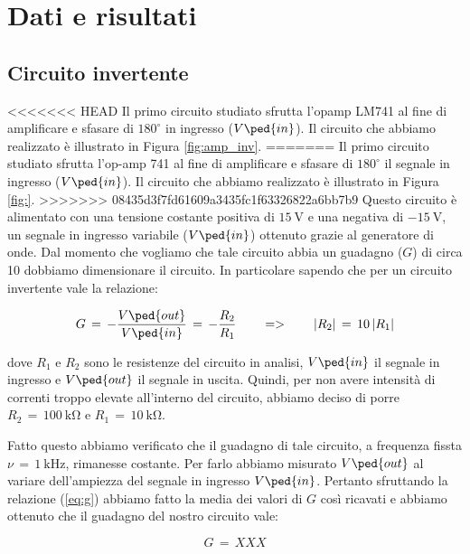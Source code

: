 \section*{Dati e risultati}

\subsection*{Circuito invertente}

<<<<<<< HEAD
Il primo circuito studiato sfrutta l'opamp LM741 al fine di amplificare e sfasare di $180^\circ$ in ingresso ($V\ped{in}$). Il circuito che abbiamo realizzato è illustrato in Figura \ref{fig:amp_inv}.
=======
Il primo circuito studiato sfrutta l'op-amp 741 al fine di amplificare e sfasare di $180^\circ$ il segnale in ingresso ($V\ped{in}$). Il circuito che abbiamo realizzato è illustrato in Figura \ref{fig:}.
>>>>>>> 08435d3f7fd61609a3435fc1f63326822a6bb7b9
Questo circuito è alimentato con una tensione costante positiva di $\SI{+15}{\volt}$ e una negativa di $\SI{-15}{\volt}$, un segnale in ingresso variabile ($V\ped{in}$) ottenuto grazie al generatore di onde.
Dal momento che vogliamo che tale circuito abbia un guadagno ($G$) di circa 10 dobbiamo dimensionare il circuito. In particolare sapendo che per un circuito invertente vale la relazione:

\begin{equation}
        G\,=\,-\frac{V\ped{out}}{V\ped{in}}\,=\,-\frac{R_2}{R_1} \qquad => \qquad |R_2|\,=\,10\,|R_1|
        \label{eq:g}
\end{equation}

dove $R_1$ e $R_2$ sono le resistenze del circuito in analisi, $V\ped{in}$ il segnale in ingresso e $V\ped{out}$ il segnale in uscita. Quindi, per non avere intensità di correnti troppo elevate all'interno del circuito, abbiamo deciso di porre $R_2\,=\,\SI{100}{\kilo\ohm}$ e $R_1\,=\,\SI{10}{\kilo\ohm}$.

Fatto questo abbiamo verificato che il guadagno di tale circuito, a frequenza fissta $\nu\,=\,\SI{1}{\kilo\hertz}$, rimanesse costante. Per farlo abbiamo misurato $V\ped{out}$ al variare dell'ampiezza del segnale in ingresso $V\ped{in}$. Pertanto sfruttando la relazione (\ref{eq:g}) abbiamo fatto la media dei valori di $G$ così ricavati e abbiamo ottenuto che il guadagno del nostro circuito vale:

\begin{equation}
        G\,=\, XXX
\end{equation}

